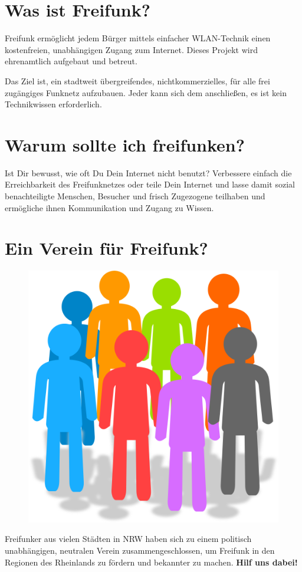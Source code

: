 \documentclass[10pt]{scrartcl}
\begin{document}
\section{\normalsize Was ist Freifunk?}
Freifunk ermöglicht jedem Bürger mittels einfacher WLAN-Technik einen 
kostenfreien, unabhängigen Zugang zum Internet.
Dieses Projekt wird ehrenamtlich aufgebaut und betreut.

Das Ziel ist, ein stadtweit übergreifendes, nichtkommerzielles, für alle frei 
zugängiges Funknetz aufzubauen.
Jeder kann sich dem anschließen, es ist kein Technikwissen erforderlich.

\section{\normalsize Warum sollte ich freifunken?}
Ist Dir bewusst, wie oft Du Dein Internet nicht benutzt? Verbessere einfach die Erreichbarkeit des Freifunknetzes oder teile Dein Internet und lasse damit sozial benachteiligte Menschen, Besucher und frisch Zugezogene teilhaben und ermögliche ihnen Kommunikation und Zugang zu Wissen.

\section{\normalsize Ein Verein für Freifunk?}
\begin{figure}
\includegraphics[scale=0.2]{Verein}
\end{figure}
Freifunker aus vielen Städten in NRW haben sich zu einem politisch unabhängigen, neutralen Verein zusammengeschlossen, um Freifunk in den Regionen des Rheinlands zu fördern und bekannter zu machen.
\textbf{Hilf uns dabei!}
\end{document}
